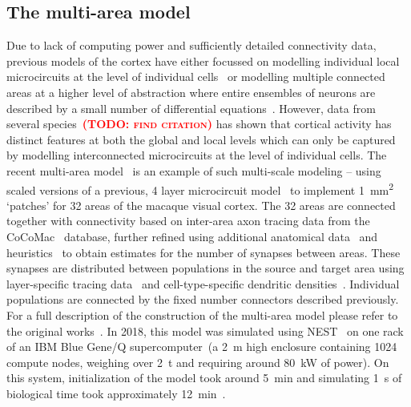\documentclass[9pt,twocolumn,twoside,lineno]{pnas-new}
\newcommand{\todo}[1]{\textbf{\textsc{\textcolor{red}{(TODO: #1)}}}}
\begin{document}
\subsection*{The multi-area model}
Due to lack of computing power and sufficiently detailed connectivity data, previous models of the cortex have either focussed on modelling individual local microcircuits at the level of individual cells~\citep{Izhikevich2008,Potjans2012} or modelling multiple connected areas at a higher level of abstraction where entire ensembles of neurons are described by a small number of differential equations~\citep{Cabral2014}.
However, data from several species~\todo{find citation} has shown that cortical activity has distinct features at both the global and local levels which can only be captured by modelling interconnected microcircuits at the level of individual cells.
The recent multi-area model~\citep{Schmidt2018a,Schmidt2018} is an example of such multi-scale modeling -- using scaled versions of a previous, 4 layer microcircuit model~\citep{Potjans2012} to implement \SI{1}{\milli\meter\squared} `patches' for 32 areas of the macaque visual cortex.
The 32 areas are connected together with connectivity based on inter-area axon tracing data from the CoCoMac~\citep{Bakker2012} database, further refined using additional anatomical data~\citep{Markov2014} and heuristics~\citep{Ercsey-Ravasz2013} to obtain estimates for the number of synapses between areas.
These synapses are distributed between populations in the source and target area using layer-specific tracing data~\citep{Markov2014b} and cell-type-specific dendritic densities~\citep{Binzegger2004}.
Individual populations are connected by the fixed number connectors described previously.
For a full description of the construction of the multi-area model please refer to the original works~\citep{Schmidt2018a,Schmidt2018}.
In 2018, this model was simulated using NEST~\citep{Gewaltig2007} on one rack of an IBM Blue Gene/Q supercomputer~(a \SI{2}{\metre} high enclosure containing \num{1024} compute nodes, weighing over \SI{2}{\tonne} and requiring around \SI{80}{\kilo\watt} of power).
On this system, initialization of the model took around \SI{5}{\minute} and simulating \SI{1}{\second} of biological time took approximately \SI{12}{\minute}~\citep{Schmidt2018}.
\end{document}
